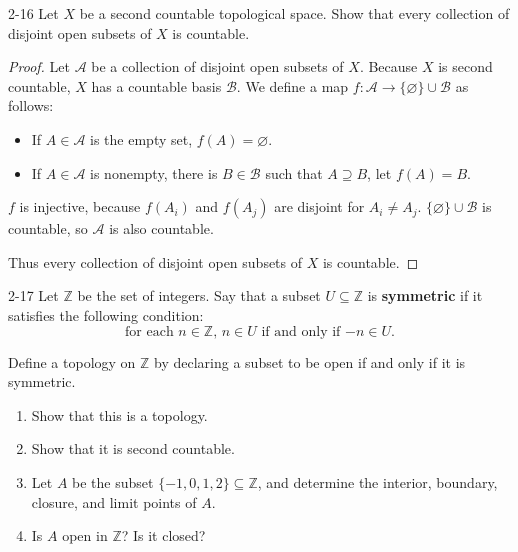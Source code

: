 \begin{problem}{2-16}
Let $X$ be a second countable topological space. Show that every collection of disjoint open subsets of $X$ is countable.
\end{problem}

\begin{proof}
	Let $\mathscr{A}$ be a collection of disjoint open subsets of $X$. Because $X$ is second countable, $X$ has a countable basis $\mathscr{B}$. We define a map $f: \mathscr{A}\to \{ \varnothing \}\cup\mathscr{B}$ as follows:
	\begin{itemize}
		\item If $A\in\mathscr{A}$ is the empty set, $f(A) = \varnothing$.
		\item If $A\in\mathscr{A}$ is nonempty, there is $B\in\mathscr{B}$ such that $A\supseteq B$, let $f(A) = B$.
	\end{itemize}

	$f$ is injective, because $f(A_{i})$ and $f(A_{j})$ are disjoint for $A_{i}\ne A_{j}$. $\{ \varnothing \}\cup\mathscr{B}$ is countable, so $\mathscr{A}$ is also countable.

	Thus every collection of disjoint open subsets of $X$ is countable.
\end{proof}

\begin{problem}{2-17}\label{problem:2-17}
Let $\mathbb{Z}$ be the set of integers. Say that a subset $U\subseteq \mathbb{Z}$ is \textbf{symmetric} if it satisfies the following condition:
\[
	\text{for each $n\in\mathbb{Z}$, $n\in U$ if and only if $-n\in U$.}
\]

Define a topology on $\mathbb{Z}$ by declaring a subset to be open if and only if it is symmetric.
\begin{enumerate}[label={(\alph*)}]
	\item Show that this is a topology.
	\item Show that it is second countable.
	\item  Let $A$ be the subset $\{ -1, 0, 1, 2 \}\subseteq\mathbb{Z}$, and determine the interior, boundary, closure, and limit points of $A$.
	\item Is $A$ open in $\mathbb{Z}$? Is it closed?
\end{enumerate}
\end{problem}

